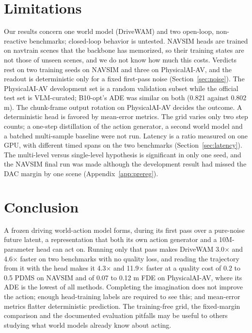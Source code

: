 \documentclass[10pt]{article}
\begin{document}
\section{Limitations}
\label{sec:limitations}

Our results concern one world model (DriveWAM) and two open-loop, non-reactive benchmarks; closed-loop behavior is untested. NAVSIM heads are trained on navtrain scenes that the backbone has memorized, so their training states are not those of unseen scenes, and we do not know how much this costs. Verdicts rest on two training seeds on NAVSIM and three on PhysicalAI-AV, and the readout is deterministic only for a fixed first-pass noise (Section~\ref{sec:noise}). The PhysicalAI-AV development set is a random validation subset while the official test set is VLM-curated; B10-opt's ADE was similar on both (0.821 against 0.802 m). The chunk-frame output rotation on PhysicalAI-AV decides the outcome. A deterministic head is favored by mean-error metrics. The grid varies only two step counts; a one-step distillation of the action generator, a second world model and a batched multi-sample baseline were not run. Latency is a ratio measured on one GPU, with different timed spans on the two benchmarks (Section~\ref{sec:latency}). The multi-level versus single-level hypothesis is significant in only one seed, and the NAVSIM final run was made although the development result had missed the DAC margin by one scene (Appendix~\ref{app:prereg}).

\section{Conclusion}
\label{sec:conclusion}

A frozen driving world-action model forms, during its first pass over a pure-noise future latent, a representation that both its own action generator and a 10M-parameter head can act on. Running only that pass makes DriveWAM 3.0$\times$ and 4.6$\times$ faster on two benchmarks with no quality loss, and reading the trajectory from it with the head makes it 4.3$\times$ and 11.9$\times$ faster at a quality cost of 0.2 to 0.5 PDMS on NAVSIM and of 0.07 to 0.12 m FDE on PhysicalAI-AV, where its ADE is the lowest of all methods. Completing the imagination does not improve the action; enough head-training labels are required to see this; and mean-error metrics flatter deterministic prediction. The training-free grid, the fixed-margin comparison and the documented evaluation pitfalls may be useful to others studying what world models already know about acting.
\end{document}
